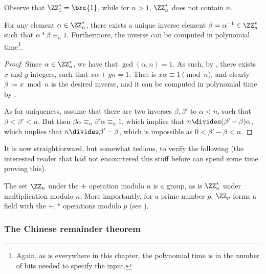 \begin{remark}
    Observe that $\ZZ_1^* = \brc{1}$, while for $n >1$, $\ZZ_n^*$ does
    not contain $n$.
\end{remark}

\begin{lemma}
    For any element $\alpha \in \ZZ_n^*$, there exists a unique
    inverse element $\beta = \alpha^{-1} \in \ZZ_n^*$ such that
    $\alpha * \beta \equiv_n 1$. Furthermore, the inverse can be
    computed in polynomial time\footnote{Again, as is everywhere in
       this chapter, the polynomial time is in the number of bits
       needed to specify the input.}.
\end{lemma}

\begin{proof}
    Since $\alpha \in \ZZ_n^*$, we have that $\gcd(\alpha, n) =1$. As
    such,\newline
    by , there exists $x$ and $y$
    integers, such that $x \alpha + y n =1$. That is
    $x \alpha \equiv 1 \pmod{n}$, and clearly $\beta := x \bmod n$ is
    the desired inverse, and it can be computed in polynomial time by
    .

    As for uniqueness, assume that there are two inverses
    $\beta,\beta'$ to $\alpha < n$, such that $\beta < \beta' <
    n$. But then $\beta \alpha \equiv_n \beta' \alpha \equiv_n 1$,
    which implies that $n \divides (\beta' -\beta) \alpha$, which
    implies that $n \divides \beta' - \beta$, which is impossible as
    $0 < \beta' - \beta < n$.
\end{proof}

It is now straightforward, but somewhat tedious, to verify the
following (the interested reader that had not encountered this stuff
before can spend some time proving this).
\begin{lemma}
    The set $\ZZ_n$ under the $+$ operation modulo $n$ is a group, as
    is $\ZZ_n^*$ under multiplication modulo $n$. More importantly,
    for a prime number $p$, $\ZZ_p$ forms a field with the $+,*$
    operations modulo $p$ (see ).
\end{lemma}

\subsubsection{The Chinese remainder theorem}

